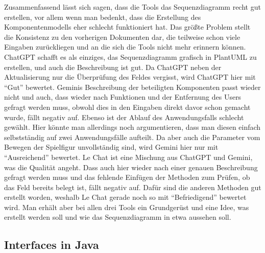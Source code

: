 Zusammenfassend lässt sich sagen, dass die Tools das Sequenzdiagramm recht gut erstellen, vor allem wenn man bedenkt, dass die 
Erstellung des Komponentenmodells eher schlecht funktioniert hat. Das größte Problem stellt die Konsistenz zu den vorherigen 
Dokumenten dar, die teilweise schon viele Eingaben zurückliegen und an die sich die Tools nicht mehr erinnern können. ChatGPT schafft 
es als einziges, das Sequenzdiagramm grafisch in PlantUML zu erstellen, und auch die Beschreibung ist gut. Da ChatGPT neben der 
Aktualisierung nur die Überprüfung des Feldes vergisst, wird ChatGPT hier mit ``Gut'' bewertet. Geminis Beschreibung der beteiligten 
Komponenten passt wieder nicht und auch, dass wieder nach Funktionen und der Entfernung des Users gefragt werden muss, obwohl dies in 
den Eingaben direkt davor schon gemacht wurde, fällt negativ auf. Ebenso ist der Ablauf des Anwendungsfalls schlecht gewählt. Hier 
könnte man allerdings noch argumentieren, dass man diesen einfach selbstständig auf zwei Anwendungsfälle aufteilt. Da aber auch die 
Parameter vom Bewegen der Spielfigur unvollständig sind, wird Gemini hier nur mit ``Ausreichend'' bewertet. Le Chat ist eine Mischung 
aus ChatGPT und Gemini, was die Qualität angeht. Dass auch hier wieder nach einer genauen Beschreibung gefragt werden muss und das 
fehlende Einfügen der Methoden zum Prüfen, ob das Feld bereits belegt ist, fällt negativ auf. Dafür sind die anderen Methoden gut 
erstellt worden, weshalb Le Chat gerade noch so mit ``Befriedigend'' bewertet wird. Man erhält aber bei allen drei Tools ein Grundgerüst 
und eine Idee, was erstellt werden soll und wie das Sequenzdiagramm in etwa aussehen soll.

\subsection*{Interfaces in Java} 

